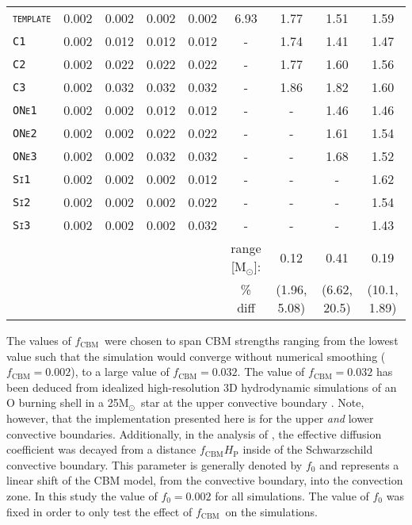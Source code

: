 \documentclass[useAMS,usenatbib]{mn2e}
\newcommand{\Msun}{\ensuremath{\mathrm{M}_\odot}}
\newcommand{\fcbm}{\ensuremath{f_\mathrm{CBM}}}
\newcommand{\template}{\textsc{\texttt{template}}}
\newcommand{\Ca}{\textsc{\texttt{C1}}}
\newcommand{\Cb}{\textsc{\texttt{C2}}}
\newcommand{\Cc}{\textsc{\texttt{C3}}}
\newcommand{\ONea}{\textsc{\texttt{ONe1}}}
\newcommand{\ONeb}{\textsc{\texttt{ONe2}}}
\newcommand{\ONec}{\textsc{\texttt{ONe3}}}
\newcommand{\Sia}{\textsc{\texttt{Si1}}}
\newcommand{\Sib}{\textsc{\texttt{Si2}}}
\newcommand{\Sic}{\textsc{\texttt{Si3}}}
\begin{document}
\begin{table*}
\begin{tabular}{lcccccccc}
		\tabularnewline
		\midrule
		\template  &  0.002  &  0.002  &  0.002  &  0.002  &  6.93  &  1.77  &  1.51  &  1.59 \\
		\Ca        &  0.002  &  0.012  &  0.012  &  0.012  &  -     &  1.74  &  1.41  &  1.47 \\
		\Cb        &  0.002  &  0.022  &  0.022  &  0.022  &  -     &  1.77  &  1.60  &  1.56 \\
		\Cc        &  0.002  &  0.032  &  0.032  &  0.032  &  -     &  1.86  &  1.82  &  1.60 \\
		\ONea      &  0.002  &  0.002  &  0.012  &  0.012  &  -     &  -     &  1.46  &  1.46 \\
		\ONeb      &  0.002  &  0.002  &  0.022  &  0.022  &  -     &  -     &  1.61  &  1.54 \\
		\ONec      &  0.002  &  0.002  &  0.032  &  0.032  &  -     &  -     &  1.68  &  1.52 \\
		\Sia       &  0.002  &  0.002  &  0.002  &  0.012  &  -     &  -     &  -     &  1.62 \\
		\Sib       &  0.002  &  0.002  &  0.002  &  0.022  &  -     &  -     &  -     &  1.54 \\
		\Sic       &  0.002  &  0.002  &  0.002  &  0.032  &  -     &  -     &  -     &  1.43 \\
		\midrule
		           &         &         &         &         & range [\Msun]: &  0.12  &  0.41  &  0.19 \\
                           &         &         &         &         &  \% diff   &  (1.96, 5.08)  &  (6.62, 20.5)  &  (10.1, 1.89)  \\
		\bottomrule
	\end{tabular}
	\label{tab:par}
\end{table*}

The values of \fcbm~were chosen to span CBM strengths ranging from the lowest
value such that the simulation would converge without numerical smoothing
($\fcbm=0.002$), to a large value of $\fcbm=0.032$. The value of $\fcbm =
0.032$ has been deduced from idealized high-resolution 3D hydrodynamic
simulations of an O burning shell in a 25\Msun~star at the upper convective
boundary \citep{Jones2016}. Note, however, that the implementation presented
here is for the upper \emph{and} lower convective boundaries. Additionally, in
the analysis of \citet{Jones2016}, the effective diffusion coefficient was
decayed from a distance $\fcbm H_{\mathrm{P}}$ inside of the Schwarzschild
convective boundary. This parameter is generally denoted by $f_0$ and
represents a linear shift of the CBM model, from the convective boundary, into
the convection zone. In this study the value of $f_{0} = 0.002$ for all
simulations.  The value of $f_0$ was fixed in order to only test the effect of
\fcbm\ on the simulations.
\end{document}

